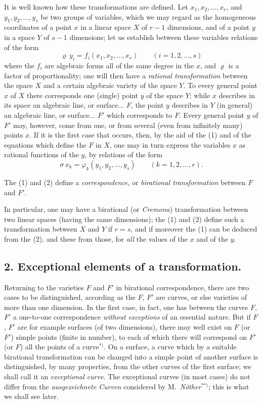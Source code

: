 \documentclass{article}
\begin{document}
It is well known how these transformations are defined. Let $x_{1}, x_{2}, \ldots , x_{r}$, and $y_{1}, y_{2}, \ldots , y_{s}$ be two groups of variables, which we may regard as the homogeneous coordinates of a point $x$ in a linear space $X$ of $r-1$ dimensions, and of a point $y$ in a space $Y$ of $s-1$ dimensions; let us establish between these variables relations of the form
\[ \varrho\, y_{i} = f_{i}(x_{1}, x_{2}, \ldots , x_{r}) \qquad (i = 1, 2, \ldots , s) \tag{1} \]
where the $f_{i}$ are algebraic forms all of the same degree in the $x$, and $\varrho$ is a factor of proportionality; one will then have a \emph{rational transformation} between the space $X$ and a certain algebraic variety of the space $Y$. To every general point $x$ of $X$ there corresponds one (single) point $y$ of the space $Y$; while $x$ describes in its space an algebraic line, or surface... $F$, the point $y$ describes in $Y$ (in general) an algebraic line, or surface... $F'$ which corresponds to $F$. Every general point $y$ of $F'$ may, however, come from one, or from several (even from infinitely many) points $x$. If it is the first case that occurs, then, by the aid of the (1) and of the equations which define the $F$ in $X$, one may in turn express the variables $x$ as rational functions of the $y$, by relations of the form
\[ \sigma\, x_{k} = \varphi_{k}(y_{1}, y_{2}, \ldots , y_{s}) \qquad (k = 1, 2, \ldots , r). \tag{2} \]

The (1) and (2) define a \emph{correspondence}, or \emph{birational transformation} between $F$ and $F'$.


In particular, one may have a birational (or \emph{Cremona}) transformation between two linear spaces (having the same dimensions); the (1) and (2) define such a transformation between $X$ and $Y$ if $r = s$, and if moreover the (1) can be deduced from the (2), and these from those, for \emph{all} the values of the $x$ and of the $y$.

\subsection*{2. Exceptional elements of a transformation.}

Returning to the varieties $F$ and $F'$ in birational correspondence, there are two cases to be distinguished, according as the $F$, $F'$ are curves, or else varieties of more than one dimension. In the first case, in fact, one has between the curves $F$, $F'$ a one-to-one correspondence \emph{without exceptions} of an essential nature. But if $F$, $F'$ are for example surfaces (of two dimensions), there may well exist on $F$ (or $F'$) simple points (finite in number), to each of which there will correspond on $F'$ (or $F$) all the points of a curve${}^{*)}$. On a surface, a curve which by a suitable birational transformation can be changed into a simple point of another surface is distinguished, by many properties, from the other curves of the first surface; we shall call it an \emph{exceptional curve}. The exceptional curves (in most cases) do not differ from the \emph{ausgezeichnete Curven} considered by M.\ \emph{Nöther}${}^{**)}$; this is what we shall see later.
\end{document}
